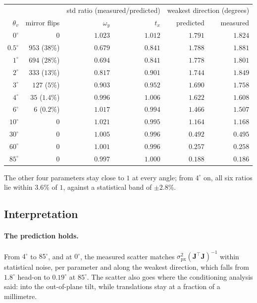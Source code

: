 \documentclass[11pt,a4paper]{article}
\theoremstyle{remark}
\newcommand{\Jmat}{\mathbf{J}}
\begin{document}
\begin{center}
\small
\begin{tabular}{@{}rrrrrr@{}}
\toprule
 & & \multicolumn{2}{c}{std ratio (measured/predicted)}
 & \multicolumn{2}{c}{weakest direction (degrees)} \\
$\theta_v$ & mirror flips & $\omega_y$ & $t_x$ & predicted & measured \\
\midrule
$0^{\circ}$   & $0$            & $1.023$ & $1.012$ & $1.791$ & $1.824$ \\
$0.5^{\circ}$ & $953$ ($38\%$) & $0.679$ & $0.841$ & $1.788$ & $1.881$ \\
$1^{\circ}$   & $694$ ($28\%$) & $0.694$ & $0.841$ & $1.778$ & $1.801$ \\
$2^{\circ}$   & $333$ ($13\%$) & $0.817$ & $0.901$ & $1.744$ & $1.849$ \\
$3^{\circ}$   & $127$ ($5\%$)  & $0.903$ & $0.952$ & $1.690$ & $1.758$ \\
$4^{\circ}$   & $35$ ($1.4\%$) & $0.996$ & $1.006$ & $1.622$ & $1.608$ \\
$6^{\circ}$   & $6$ ($0.2\%$)  & $1.017$ & $0.994$ & $1.466$ & $1.507$ \\
$10^{\circ}$  & $0$            & $1.021$ & $0.995$ & $1.164$ & $1.168$ \\
$30^{\circ}$  & $0$            & $1.005$ & $0.996$ & $0.492$ & $0.495$ \\
$60^{\circ}$  & $0$            & $1.001$ & $0.996$ & $0.257$ & $0.258$ \\
$85^{\circ}$  & $0$            & $0.997$ & $1.000$ & $0.188$ & $0.186$ \\
\bottomrule
\end{tabular}
\end{center}

\noindent
The other four parameters stay close to $1$ at every angle; from $4^{\circ}$
on, all six ratios lie within $3.6\%$ of $1$, against a statistical band of
$\pm2.8\%$.

\subsection{Interpretation}

\paragraph{The prediction holds.} From $4^{\circ}$ to $85^{\circ}$, and at
$0^{\circ}$, the measured scatter matches $\sigma_{\mathrm{px}}^2
(\Jmat^{\top}\Jmat)^{-1}$ within statistical noise, per parameter and along the
weakest direction, which falls from $1.8^{\circ}$ head-on to $0.19^{\circ}$ at
$85^{\circ}$. The scatter also goes where the conditioning analysis said: into
the out-of-plane tilt, while translations stay at a fraction of a millimetre.
\end{document}
